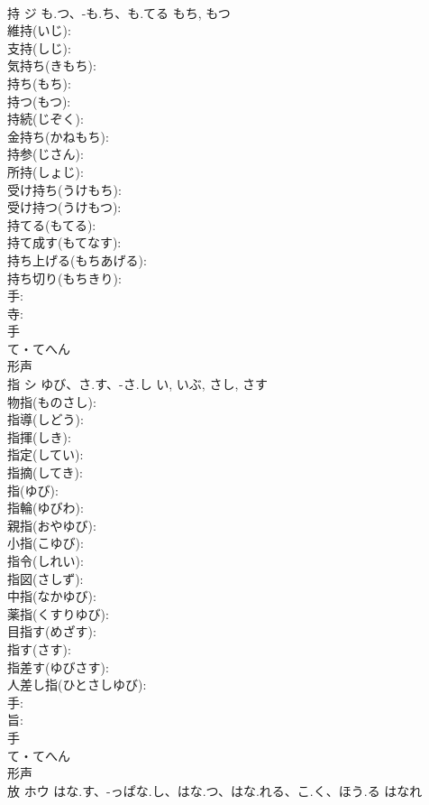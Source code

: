 \documentclass[8pt]{extreport}
\begin{document}
\begin{CJK}{UTF8}{min}
\\	持	ジ	も.つ、-も.ち、も.てる	もち, もつ	
\\	維持(いじ): 
\\	支持(しじ): 
\\	気持ち(きもち): 
\\	持ち(もち): 
\\	持つ(もつ): 
\\	持続(じぞく): 
\\	金持ち(かねもち): 
\\	持参(じさん): 
\\	所持(しょじ): 
\\	受け持ち(うけもち): 
\\	受け持つ(うけもつ): 
\\	持てる(もてる): 
\\	持て成す(もてなす): 
\\	持ち上げる(もちあげる): 
\\	持ち切り(もちきり): 
\\	手: 
\\	寺: 
\\	手	
\\	て・てへん	
\\	形声 
\\	指	シ	ゆび、さ.す、-さ.し	い, いぶ, さし, さす	
\\	物指(ものさし): 
\\	指導(しどう): 
\\	指揮(しき): 
\\	指定(してい): 
\\	指摘(してき): 
\\	指(ゆび): 
\\	指輪(ゆびわ): 
\\	親指(おやゆび): 
\\	小指(こゆび): 
\\	指令(しれい): 
\\	指図(さしず): 
\\	中指(なかゆび): 
\\	薬指(くすりゆび): 
\\	目指す(めざす): 
\\	指す(さす): 
\\	指差す(ゆびさす): 
\\	人差し指(ひとさしゆび): 
\\	手: 
\\	旨: 
\\	手	
\\	て・てへん	
\\	形声 
\\	放	ホウ	はな.す、-っぱな.し、はな.つ、はな.れる、こ.く、ほう.る	はなれ	

\end{CJK}
\end{document}
